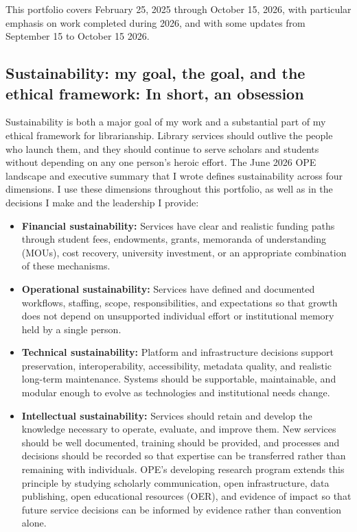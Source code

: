 This portfolio covers February 25, 2025 through October 15, 2026, with particular emphasis on work completed during 2026, and with some updates from September 15 to October 15 2026. 

\subsection{Sustainability: my goal, the goal, and the ethical framework: In short, an obsession}

Sustainability is both a major goal of my work and a substantial part of my ethical framework for librarianship. Library services should outlive the people who launch them, and they should continue to serve scholars and students without depending on any one person's heroic effort. The June 2026 OPE landscape and executive summary that I wrote defines sustainability across four dimensions. I use these dimensions throughout this portfolio, as well as in the decisions I make and the leadership I provide:

\begin{itemize}
\item \textbf{Financial sustainability:} Services have clear and realistic funding paths through student fees, endowments, grants, memoranda of understanding (MOUs), cost recovery, university investment, or an appropriate combination of these mechanisms.

\item \textbf{Operational sustainability:} Services have defined and documented workflows, staffing, scope, responsibilities, and expectations so that growth does not depend on unsupported individual effort or institutional memory held by a single person.

\item \textbf{Technical sustainability:} Platform and infrastructure decisions support preservation, interoperability, accessibility, metadata quality, and realistic long-term maintenance. Systems should be supportable, maintainable, and modular enough to evolve as technologies and institutional needs change.

\item \textbf{Intellectual sustainability:} Services should retain and develop the knowledge necessary to operate, evaluate, and improve them. New services should be well documented, training should be provided, and processes and decisions should be recorded so that expertise can be transferred rather than remaining with individuals. OPE's developing research program extends this principle by studying scholarly communication, open infrastructure, data publishing, open educational resources (OER), and evidence of impact so that future service decisions can be informed by evidence rather than convention alone.
\end{itemize}

